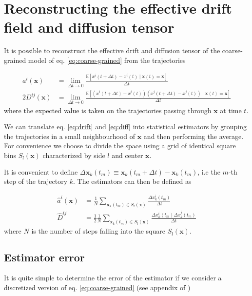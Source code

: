 \documentclass[14pt,a4paper]{article}
\begin{document}
\section{Reconstructing the effective drift field and diffusion tensor}

It is possible to reconstruct the effective drift and diffusion tensor of the coarse-grained model of eq. \ref{eq:coarse-grained} from the trajectories \cite{hoze2014} \cite{schuss}

\begin{align}
a^i(\bm{x}) &= \lim_{\Delta t \to 0}\frac{\mathbb{E}\left[x^i(t + \Delta t) - x^i(t) \mid \bm{x}(t) = \bm{x}\right]}{\Delta t} \label{eq:drift}\\
2D^{ij}(\bm{x}) &= \lim_{\Delta t \to 0}\frac{\mathbb{E}\left[\left(x^i(t + \Delta t) - x^i(t)\right)\left(x^j(t + \Delta t) - x^j(t)\right) \mid \bm{x}(t) = \bm{x}\right]}{\Delta t} \label{eq:diff}
\end{align}
where the expected value is taken on the trajectories passing through $\bm{x}$ at time $t$.

We can translate eq. \ref{eq:drift} and \ref{eq:diff} into statistical estimators by grouping the trajectories in a small neighbourhood of $\bm{x}$ and then performing the average. For convenience we choose to divide the space using a grid of identical square bins $S_l(\bm{x})$ characterized by side $l$ and center $\bm{x}$.

It is convenient to define $\Delta \bm{x}_k(t_m) \equiv \bm{x}_k(t_m + \Delta t) - \bm{x}_k(t_m)$, i.e the $m$-th step of the trajectory $k$. The estimators can then be defined as

\begin{align}
\hat{a}^i({\bm{x}}) &= \frac{1}{N} \sum_{\bm{x}_k(t_m) \in S_l(\bm{x})} \frac{\Delta x_k^i(t_m)}{\Delta t} \label{eq:drift-estimator} \\
\hat{D}^{ij} &= \frac{1}{2} \frac{1}{N} \sum_{\bm{x}_k(t_m) \in S_l(\bm{x})}\frac{\Delta x_k^i(t_m) \Delta x_k^j(t_m)}{\Delta t} \label{eq:diff-estimator}
\end{align}
where $N$ is the number of steps falling into the square $S_l(\bm{x})$.

\subsection{Estimator error}

It is quite simple to determine the error of the estimator if we consider a discretized version of eq. \ref{eq:coarse-grained} (see appendix of \cite{hoze2012})
\end{document}
